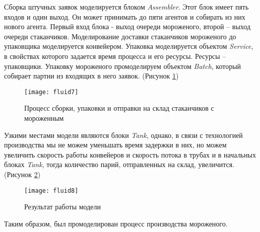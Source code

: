Сборка штучных заявок моделируется блоком \textit{Assembler}. Этот блок имеет пять входов и один выход. Он может принимать до пяти агентов и собирать из них нового агента. Первый вход блока - выход очереди мороженого, второй -- выход очереди стаканчиков. Моделирование доставки стаканчиков мороженого до упаковщика моделируется конвейером. Упаковка моделируется объектом \textit{Service}, в свойствах которого задается время процесса и его ресурсы. Ресурсы -- упаковщики. Упаковку мороженого промоделируем объектом \textit{Batch}, который собирает партии из входящих в него заявок. (Рисунок \ref{fig:fluid7})

\begin{figure}[h]
	\centering \texttt{[image: fluid7]}
	\caption{Процесс сборки, упаковки и отправки на склад стаканчиков с мороженным}
	\label{fig:fluid7}
\end{figure}

 Узкими местами модели являются блоки \textit{Tank}, однако, в связи с технологией производства мы не можем уменьшать время задержки в них, но можем  увеличить скорость работы конвейеров и скорость потока в трубах и в начальных блоках \textit{Tank}, тогда количество парий, отправленных на склад, увеличится. (Рисунок \ref{fig:fluid8})
 
 \begin{figure}[h]
 	\centering \texttt{[image: fluid8]}
 	\caption{Результат работы модели}
 	\label{fig:fluid8}
 \end{figure}

Таким образом, был промоделирован процесс производства мороженого.